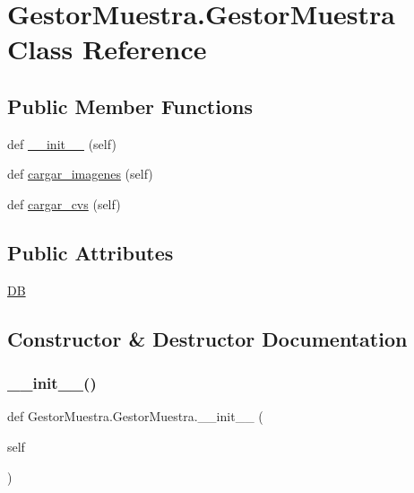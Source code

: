 \hypertarget{class_gestor_muestra_1_1_gestor_muestra}{}\section{Gestor\+Muestra.\+Gestor\+Muestra Class Reference}
\label{class_gestor_muestra_1_1_gestor_muestra}
\subsection*{Public Member Functions}
\begin{DoxyCompactItemize}
\item 
def \mbox{\hyperlink{class_gestor_muestra_1_1_gestor_muestra_a4ecb9256f16f15aa652b277297eb8879}{\+\_\+\+\_\+init\+\_\+\+\_\+}} (self)
\item 
def \mbox{\hyperlink{class_gestor_muestra_1_1_gestor_muestra_a3acc1dd10c8408638d2079a22a4ce373}{cargar\+\_\+imagenes}} (self)
\item 
def \mbox{\hyperlink{class_gestor_muestra_1_1_gestor_muestra_ab63f7733704d3f96d3c35f36481b3c21}{cargar\+\_\+cvs}} (self)
\end{DoxyCompactItemize}
\subsection*{Public Attributes}
\begin{DoxyCompactItemize}
\item 
\mbox{\hyperlink{class_gestor_muestra_1_1_gestor_muestra_ab4df90a4af99c2d10b6b1d468d45f7d7}{DB}}
\end{DoxyCompactItemize}


\subsection{Constructor \& Destructor Documentation}
\mbox{\label{class_gestor_muestra_1_1_gestor_muestra_a4ecb9256f16f15aa652b277297eb8879}} 
\subsubsection{\texorpdfstring{\+\_\+\+\_\+init\+\_\+\+\_\+()}{\_\_init\_\_()}}
{\footnotesize\ttfamily def Gestor\+Muestra.\+Gestor\+Muestra.\+\_\+\+\_\+init\+\_\+\+\_\+ (\begin{DoxyParamCaption}\item[{}]{self }\end{DoxyParamCaption})}



